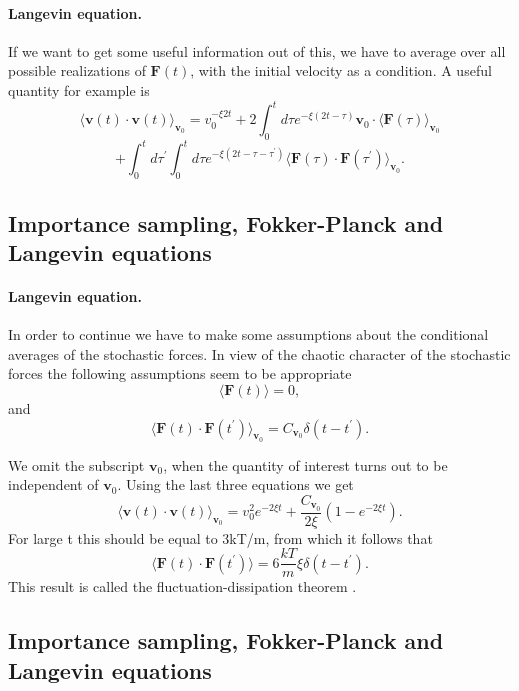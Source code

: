 \documentclass[%
twoside,                 %
final,                   %
10pt]{article}
\begin{document}
\paragraph{Langevin equation.}
If we want to get some useful information out of this, we have to average over all possible realizations of 
$\mathbf{F}(t)$, with the initial velocity as a condition. A useful quantity for example is
\[ 
\langle \mathbf{v}(t)\cdot \mathbf{v}(t)\rangle_{\mathbf{v}_{0}}=v_{0}^{-\xi 2t}
+2\int_{0}^{t}d\tau e^{-\xi (2t-\tau)}\mathbf{v}_{0}\cdot \langle \mathbf{F}(\tau )\rangle_{\mathbf{v}_{0}}
\]
\[  	  	
 +\int_{0}^{t}d\tau ^{\prime }\int_{0}^{t}d\tau e^{-\xi (2t-\tau -\tau ^{\prime })}
\langle \mathbf{F}(\tau )\cdot \mathbf{F}(\tau ^{\prime })\rangle_{ \mathbf{v}_{0}}.
\]





\subsection*{Importance sampling, Fokker-Planck and Langevin equations}

\paragraph{Langevin equation.}
In order to continue we have to make some assumptions about the conditional averages of the stochastic forces. 
In view of the chaotic character of the stochastic forces the following 
assumptions seem to be appropriate
\[ 
\langle \mathbf{F}(t)\rangle=0, 
\]
and
\[
\langle \mathbf{F}(t)\cdot \mathbf{F}(t^{\prime })\rangle_{\mathbf{v}_{0}}=  C_{\mathbf{v}_{0}}\delta (t-t^{\prime }).
\] 	

We omit the subscript $\mathbf{v}_{0}$, when the quantity of interest turns out to be independent of $\mathbf{v}_{0}$. Using the last three equations we get
 \[
\langle \mathbf{v}(t)\cdot \mathbf{v}(t)\rangle_{\mathbf{v}_{0}}=v_{0}^{2}e^{-2\xi t}+\frac{C_{\mathbf{v}_{0}}}{2\xi }(1-e^{-2\xi t}).
\]
For large t this should be equal to 3kT/m, from which it follows that
\[
\langle \mathbf{F}(t)\cdot \mathbf{F}(t^{\prime })\rangle =6\frac{kT}{m}\xi \delta (t-t^{\prime }). 
\]
This result is called the fluctuation-dissipation theorem .




\subsection*{Importance sampling, Fokker-Planck and Langevin equations}
\end{document}
